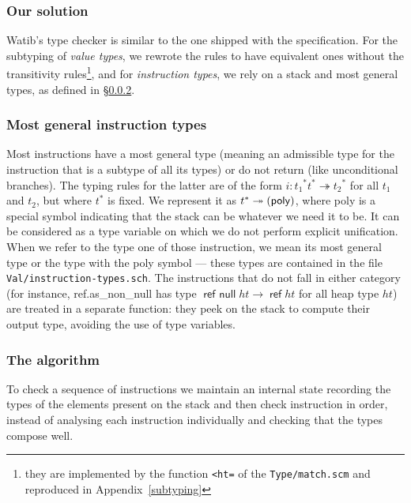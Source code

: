 \documentclass[a4paper,11pt]{article}
\DeclareMathOperator{\reft}{\textsf{ref}}
\DeclareMathOperator{\refnullt}{\textsf{ref null}}
\begin{document}
\subsubsection{Our solution}
\textsf{Watib}'s type checker is similar to the one shipped with the
specification. For the subtyping of \emph{value types}, we rewrote the rules to
have equivalent ones without the transitivity rules\footnote{they are
implemented by the function \texttt{<ht=} of the \texttt{Type/match.scm} and
reproduced in Appendix~\ref{subtyping}}, and for \emph{instruction types}, we
rely on a stack and most general types, as defined in \S\ref{mgt}.

\subsubsection{Most general instruction types}\label{mgt}
Most instructions have a most general type (meaning an admissible type for the
instruction that is a subtype of all its types) or do not return (like
unconditional branches). The typing rules for the latter are of the form
$i:{t_1}^*t^*\twoheadrightarrow {t_2}^*$ for all $t_1$ and $t_2$, but where
$t^*$ is fixed. We represent it as $t^*\twoheadrightarrow
(\text{\textsf{poly}})$, where \textsf{poly} is a special symbol indicating that
the stack can be whatever we need it to be. It can be considered as a type variable
on which we do not perform explicit unification. When we refer to the type one
of those instruction, we mean its most general type or the type with the
\textsf{poly} symbol --- these types are contained in the file
\texttt{Val/instruction-types.sch}. The instructions that do not fall in either
category (for instance, \textsf{ref.as\_non\_null} has type $\refnullt ht\to
\reft ht$ for all heap type $ht$) are treated in a separate function: they peek
on the stack to compute their output type, avoiding the use of type variables.

\subsubsection{The algorithm}
To check a sequence of instructions we maintain an internal state recording the
types of the elements present on the stack and then check instruction in order,
instead of analysing each instruction individually and checking that the types
compose well.
\end{document}
